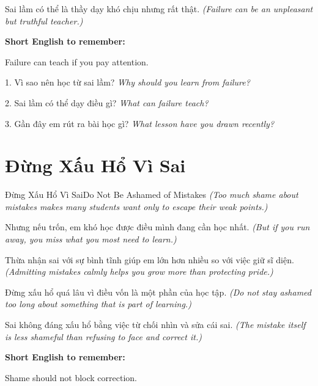 \begin{baihoc}
Sai lầm có thể là thầy dạy khó chịu nhưng rất thật.
\textit{(Failure can be an unpleasant but truthful teacher.)}
\end{baihoc}

\begin{ghinhoanh}
\textbf{Short English to remember:}

Failure can teach if you pay attention.

\end{ghinhoanh}

\begin{tuhocnhanh}
1. Vì sao nên học từ sai lầm? \textit{Why should you learn from failure?}

2. Sai lầm có thể dạy điều gì? \textit{What can failure teach?}

3. Gần đây em rút ra bài học gì? \textit{What lesson have you drawn recently?}
\end{tuhocnhanh}
\ngancach

\section{Đừng Xấu Hổ Vì Sai}
\begin{truyen}{Đừng Xấu Hổ Vì Sai}{Do Not Be Ashamed of Mistakes}
\textit{(Too much shame about mistakes makes many students want only to escape their weak points.)}

Nhưng nếu trốn, em khó học được điều mình đang cần học nhất.
\textit{(But if you run away, you miss what you most need to learn.)}

Thừa nhận sai với sự bình tĩnh giúp em lớn hơn nhiều so với việc giữ sĩ diện.
\textit{(Admitting mistakes calmly helps you grow more than protecting pride.)}

Đừng xấu hổ quá lâu vì điều vốn là một phần của học tập.
\textit{(Do not stay ashamed too long about something that is part of learning.)}
\end{truyen}

\begin{baihoc}
Sai không đáng xấu hổ bằng việc từ chối nhìn và sửa cái sai.
\textit{(The mistake itself is less shameful than refusing to face and correct it.)}
\end{baihoc}

\begin{ghinhoanh}
\textbf{Short English to remember:}

Shame should not block correction.

\end{ghinhoanh}

